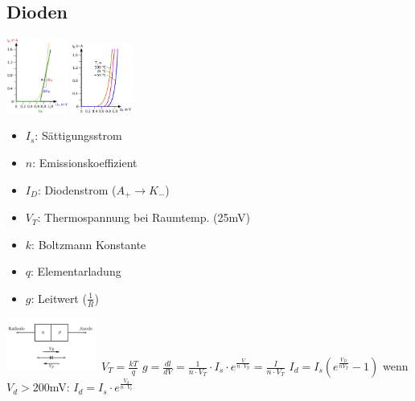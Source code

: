 \documentclass[margin=normal]{tex/hsrzf}
\begin{document}
\begin{multicols}{2}

  \subsection{Dioden}
  \includegraphics[width = 2cm]{img/Halbleiter/DifferenziellDiode.png}
  \includegraphics[width = 2cm]{img/Halbleiter/TemperaturkurvenDiode.png}
  {\tiny \begin{itemize}[leftmargin=*]
      \item $I_s$: Sättigungsstrom
      \item $n$: Emissionskoeffizient
      \item $I_D$: Diodenstrom ($A_{+} \rightarrow K_{-}$)
      \item $V_T$: Thermospannung bei Raumtemp. (25mV)
      \item $k$: Boltzmann Konstante
      \item $q$: Elementarladung
      \item $g$: Leitwert ($\frac{1}{R}$)
    \end{itemize}}

  \includegraphics[width = 3cm]{img/Halbleiter/Diode.png}
  \newline $V_T=\frac{kT}{q}$
  \newline $g = \frac{dl}{dV}
    = \frac{1}{n \cdot V_T} \cdot I_s \cdot e^{\frac{V}{n\cdot V_T}}
    = \frac{I}{n \cdot V_T}$
  \newline $I_d =I_s(e^{\frac{V_D}{nV_T}}-1)$
  \newline wenn $V_d > 200$mV: $I_d = I_s \cdot e^{\frac{V_d}{n \cdot V_t}}$

\end{multicols}
\end{document}
